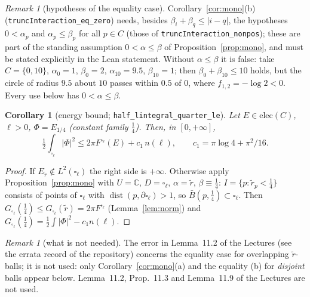 \documentclass[11pt]{article}
\newtheorem{corollary}[theorem]{Corollary}
\theoremstyle{definition}
\theoremstyle{remark}
\newtheorem{remark}[theorem]{Remark}
\newtheorem*{remarkun}{Remark}%
\newcommand{\C}{\mathbb C}
\DeclareMathOperator{\dist}{dist}
\begin{document}
\begin{remarkun}[hypotheses of the equality case]\label{rem:eqzero}
Corollary~\ref{cor:mono}(b) (\texttt{truncInteraction\allowbreak\_eq\allowbreak\_zero}) needs, besides $\beta_i+\beta_q\le|i-q|$, the hypotheses $0<\alpha_p$ and $\alpha_p\le\beta_p$ for all
$p\in C$ (those of \texttt{truncInteraction\allowbreak\_nonpos}); these are part of the standing assumption $0<\alpha\le\beta$ of Proposition~\ref{prop:mono},
and must be stated explicitly in the Lean statement. Without $\alpha\le\beta$ it is false: take $C=\{0,10\}$, $\alpha_0=1$, $\beta_0=2$, $\alpha_{10}=9.5$,
$\beta_{10}=1$; then $\beta_0+\beta_{10}\le10$ holds, but the circle of radius $9.5$ about $10$ passes within $0.5$ of $0$, where $f_{1,2}=-\log2<0$.
Every use below has $0<\alpha\le\beta$.
\end{remarkun}

\begin{corollary}[energy bound; \texttt{half\_lintegral\_quarter\_le}]\label{cor:EB}
Let $E\in\mathrm{elec}(C)$, $\ell>0$, $\Phi=E_{1/4}$ (constant family $\frac14$). Then, in $[0,+\infty]$,
\[
\tfrac12\int_{\square_\ell}|\Phi|^2\le2\pi F^{\square_\ell}(E)+c_1\,n(\ell),\qquad c_1=\pi\log4+\pi^2/16 .
\]
\end{corollary}
\begin{proof}
If $E_{\tilde r}\notin L^2(\square_\ell)$ the right side is $+\infty$. Otherwise apply Proposition~\ref{prop:mono} with $U=\C$, $D=\square_\ell$,
$\alpha=\tilde r$, $\beta\equiv\frac14$: $I=\{p:\tilde r_p<\frac14\}$ consists of points of $\square_\ell$ with $\dist(p,\partial\square_\ell)>1$, so
$\bar B(p,\frac14)\subset\square_\ell$. Then $G_{\square_\ell}(\tfrac14)\le G_{\square_\ell}(\tilde r)=2\pi F^{\square_\ell}$ (Lemma~\ref{lem:norm}) and
$G_{\square_\ell}(\frac14)=\frac12\int|\Phi|^2-c_1n(\ell)$.
\end{proof}

\begin{remark}[what is not needed]
The error in Lemma~11.2 of the Lectures (see the errata record of the repository) concerns the equality case for overlapping $\tilde r$-balls; it is not used: only
Corollary~\ref{cor:mono}(a) and the equality (b) for \emph{disjoint} balls appear below. Lemma~11.2, Prop.~11.3 and Lemma~11.9 of the Lectures are not used.
\end{remark}
\end{document}
